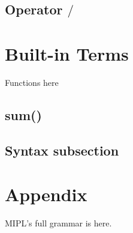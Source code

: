 \documentclass[prodmode,acmtecs]{acmsmall}
\begin{document}
\subsection{Operator $/$}

\section{Built-in Terms}
Functions here

\subsection{sum()}

\subsection{Syntax subsection}

\section*{Appendix}

MIPL's full grammar is here.

%




%
%



\medskip

\end{document}
